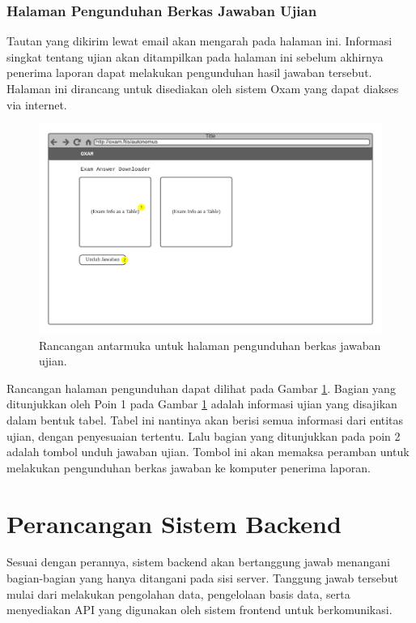 \subsubsection{Halaman Pengunduhan Berkas Jawaban Ujian}
    Tautan yang dikirim lewat email akan mengarah pada halaman ini. Informasi
    singkat tentang ujian akan ditampilkan pada halaman ini sebelum akhirnya
    penerima laporan dapat melakukan pengunduhan hasil jawaban tersebut. Halaman
    ini dirancang untuk disediakan oleh sistem Oxam yang dapat diakses via
    internet.
    
    \begin{figure}
        \centering
        \includegraphics[width=0.7\paperwidth]{Gambar/mockups/Mockup--Tambahan - Exam-extractor.pdf}
        \caption{Rancangan antarmuka untuk halaman pengunduhan berkas jawaban ujian.}
        \label{fig:mockup_addition_downloader}
    \end{figure}
    Rancangan halaman pengunduhan dapat dilihat pada Gambar
    \ref{fig:mockup_addition_downloader}. Bagian yang ditunjukkan oleh Poin 1
    pada Gambar \ref{fig:mockup_addition_downloader} adalah informasi ujian yang
    disajikan dalam bentuk tabel. Tabel ini nantinya akan berisi semua informasi
    dari entitas ujian, dengan penyesuaian tertentu. Lalu bagian yang
    ditunjukkan pada poin 2 adalah tombol unduh jawaban ujian. Tombol ini akan
    memaksa peramban untuk melakukan pengunduhan berkas jawaban ke komputer
    penerima laporan.
    
\section{Perancangan Sistem Backend}
    Sesuai dengan perannya, sistem backend akan bertanggung jawab menangani
    bagian-bagian yang hanya ditangani pada sisi server. Tanggung jawab
    tersebut mulai dari melakukan pengolahan data, pengelolaan basis data, serta
    menyediakan API yang digunakan oleh sistem frontend untuk berkomunikasi.
    
